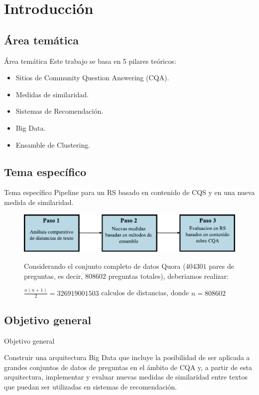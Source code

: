 \section{Introducción}

\subsection{Área temática}
\begin{frame}{Área temática}
	Este trabajo se basa en 5 pilares teóricos:
	\medskip
	\begin{itemize}
		\item Sitios de Community Question Answering (CQA).
		\item Medidas de similaridad.
		\item Sistemas de Recomendación.
		\item Big Data.
		\item Ensamble de Clustering.
	\end{itemize}
\end{frame}

\subsection{Tema específico}
\begin{frame}[allowframebreaks]{Tema específico}
	Pipeline para un RS basado en contenido de CQS y en una nueva medida de similaridad.
	\medskip
	\begin{figure}
		\centering
		\includegraphics[width=0.7\linewidth]{../5_introduccion/imagenes/pipeline}
		\label{fig:pipeline}

		\framebreak

		Considerando el conjunto completo de datos Quora (\(404301\) pares de preguntas, es decir, \(808602\) preguntas totales), deberiamos realizar:

		\bigskip $\frac{n(n+1)}{2} = 326919001503$ calculos de distancias, donde $n = 808602$
	\end{figure}
\end{frame}

\subsection{Objetivo general}
\begin{frame}{Objetivo general}
	\begin{tcolorbox}[colback=blue!5,colframe=blue!40!black,title=Objetivo general]
		Construir una arquitectura Big Data que incluye la posibilidad de ser aplicada a grandes conjuntos de datos de preguntas en el ámbito de CQA y, a partir de esta arquitectura, implementar y evaluar nuevas medidas de similaridad entre textos que puedan ser utilizadas en sistemas de recomendación.
	\end{tcolorbox}
\end{frame}

